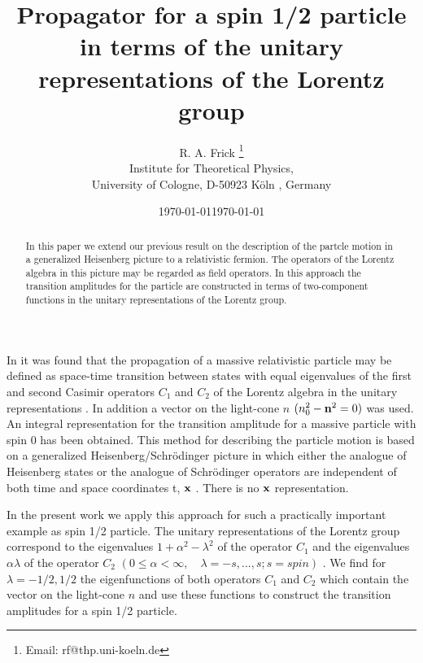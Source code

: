 \documentclass[a4paper,12pt]{article}
\begin{document}

\title {Propagator for a  spin 1/2 particle in terms of  the unitary representations of the Lorentz group}  
\date{\today}
\author{R. A. Frick  \thanks{Email: rf@thp.uni-koeln.de}\\{Institute for Theoretical Physics,}\\{ University of Cologne, D-50923 K\"oln , Germany}}
\date{\today}
\maketitle
\begin{abstract}
In this paper we extend our previous result on the description of the
partcle motion in a generalized Heisenberg picture to a relativistic
fermion.  The operators of the Lorentz algebra in this picture may be
regarded as field operators. In this approach the transition
amplitudes for the particle are constructed in terms of two-component
functions in the unitary representations of the Lorentz group.
\end{abstract}

 In \cite{Frick1} it was found that the propagation  of a massive relativistic particle  may be defined as  space-time transition between states with equal eigenvalues of the first  and  second Casimir operators $C_1$ and $C_2$ of the Lorentz algebra  in the unitary representations . In addition a vector on the light-cone $n$  $(n^2_0-{\bf n}^2=0)$ was used. An integral representation for  the transition amplitude for a massive particle with spin 0 has been obtained.
This  method for describing  the particle motion is based on a  generalized Heisenberg/Schr\"odinger  picture in which either the analogue of Heisenberg states or the analogue of Schr\"odinger operators are independent of both time and space coordinates t, ${\bf x}$ \cite{Frick2}. There is no ${\bf x}$ representation.

In the present work  we   apply   this approach for such a practically important example as spin 1/2 particle. The unitary  representations of the Lorentz group correspond to the eigenvalues $1+\alpha^2-{\lambda}^2$  of the operator $C_1$  and the eigenvalues $\alpha\lambda$ of the operator $C_2$ $(0\leq\alpha<\infty,\quad\lambda=-s,...,s; s=spin)$ \cite{Joos}. We find for $\lambda=-1/2,1/2$ the eigenfunctions of both operators $C_1$ and $C_2$ which contain the vector on the light-cone $n$ and use these functions to construct  the transition amplitudes for a spin 1/2 particle.  
\end{document}
